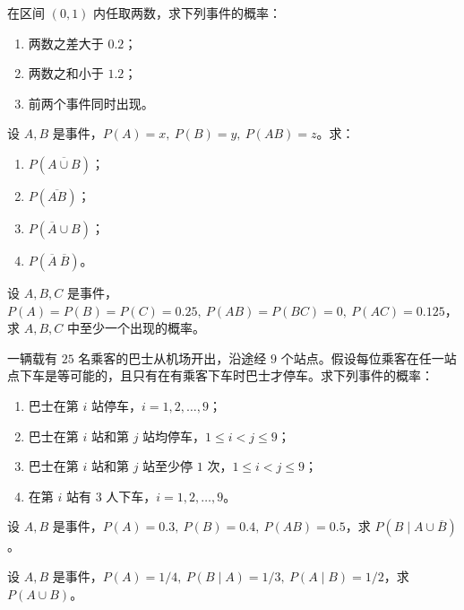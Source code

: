 \begin{homework}[1.14]
在区间 $(0,1)$ 内任取两数，求下列事件的概率：

\begin{enumerate}
  \item 两数之差大于 $0.2$；
  \item 两数之和小于 $1.2$；
  \item 前两个事件同时出现。
\end{enumerate}
\end{homework}

\begin{homework}[1.15]
设 $A,B$ 是事件，$P(A)=x,\ P(B)=y,\ P(AB)=z$。求：

\begin{enumerate}
  \item $P(\overline{A \cup B})$；
  \item $P(\overline{AB})$；
  \item $P(\overline{A} \cup B)$；
  \item $P(\overline{A}\ \overline{B})$。
\end{enumerate}
\end{homework}

\begin{homework}[1.16]
设 $A,B,C$ 是事件，$P(A)=P(B)=P(C)=0.25,\ P(AB)=P(BC)=0,\ P(AC)=0.125$，求 $A,B,C$ 中至少一个出现的概率。
\end{homework}
\begin{homework}[1.17]
一辆载有 $25$ 名乘客的巴士从机场开出，沿途经 $9$ 个站点。假设每位乘客在任一站点下车是等可能的，且只有在有乘客下车时巴士才停车。求下列事件的概率：

\begin{enumerate}
  \item 巴士在第 $i$ 站停车，$i=1,2,\dots,9$；
  \item 巴士在第 $i$ 站和第 $j$ 站均停车，$1 \le i < j \le 9$；
  \item 巴士在第 $i$ 站和第 $j$ 站至少停 $1$ 次，$1 \le i < j \le 9$；
  \item 在第 $i$ 站有 $3$ 人下车，$i=1,2,\dots,9$。
\end{enumerate}
\end{homework}

\begin{homework}[1.18]
设 $A,B$ 是事件，$P(A)=0.3,\ P(B)=0.4,\ P(AB)=0.5$，求 $P(B \mid A \cup \overline{B})$。
\end{homework}

\begin{homework}[1.19]
设 $A,B$ 是事件，$P(A)=1/4,\ P(B \mid A)=1/3,\ P(A \mid B)=1/2$，求 $P(A \cup B)$。
\end{homework}

